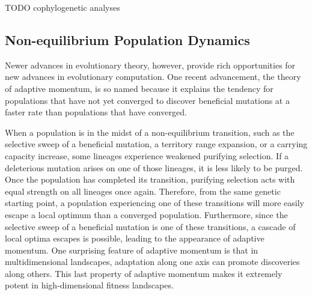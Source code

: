TODO cophylogenetic analyses

\subsection{Non-equilibrium Population Dynamics}

Newer advances in evolutionary theory, however, provide rich opportunities for new advances in evolutionary computation.
One recent advancement, the theory of adaptive momentum\cite{bohm2024reduced}, is so named because it explains the tendency for populations that have not yet converged to discover beneficial mutations at a faster rate than populations that have converged.

When a population is in the midst of a non-equilibrium transition, such as the selective sweep of a beneficial mutation, a territory range expansion, or a carrying capacity increase, some lineages experience weakened purifying selection.
If a deleterious mutation arises on one of those lineages, it is less likely to be purged.
Once the population has completed its transition, purifying selection acts with equal strength on all lineages once again.
Therefore, from the same genetic starting point, a population experiencing one of these transitions will more easily escape a local optimum than a converged population.
Furthermore, since the selective sweep of a beneficial mutation is one of these transitions, a cascade of local optima escapes is possible, leading to the appearance of adaptive momentum.
One surprising feature of adaptive momentum is that in multidimensional landscapes, adaptation along one axis can promote discoveries along others.
This last property of adaptive momentum makes it extremely potent in high-dimensional fitness landscapes.